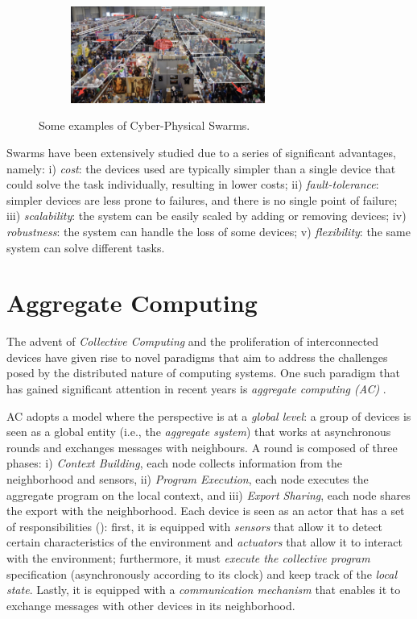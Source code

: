 \documentclass[12pt,a4paper,openright,twoside]{book}
\begin{document}
\begin{figure}[t]
\begin{subfigure}[b]{0.49\textwidth}
        \centering
        \includegraphics[width=0.7\textwidth]{figures/crowd.png}
    \end{subfigure}
    \caption{Some examples of Cyber-Physical Swarms.}%
    \label{fig:cpsw}
\end{figure}


Swarms have been extensively studied due to a series of significant advantages, namely:
    i) \emph{cost}: the devices used are typically simpler than a single device that could solve the task individually, resulting in lower costs;
    ii) \emph{fault-tolerance}: simpler devices are less prone to failures, and there is no single point of failure;
    iii) \emph{scalability}: the system can be easily scaled by adding or removing devices;
    iv) \emph{robustness}: the system can handle the loss of some devices;
    v) \emph{flexibility}: the same system can solve different tasks.


%
\section{Aggregate Computing}

The advent of \emph{Collective Computing} and the proliferation of interconnected devices have given rise to novel 
    paradigms that aim to address the challenges posed by the distributed nature of computing
    systems. One such paradigm that has gained significant attention in recent years is 
    \emph{aggregate computing (AC)} \cite{AC}.

AC adopts a model where the perspective is at a \emph{global level}: 
    a group of devices is seen as a global entity (i.e., the \emph{aggregate system}) that works at asynchronous 
    rounds and exchanges messages with neighbours. 
    A round is composed of three phases:
    i) \emph{Context Building}, each node collects information from the 
        neighborhood and sensors,
    ii) \emph{Program Execution}, each node executes the aggregate program on the local context, and
    iii) \emph{Export Sharing}, each node shares the export with the neighborhood.
    Each device is seen as an actor that has a set of responsibilities (): first, it is equipped with 
    \emph{sensors} that allow it to detect certain characteristics of the environment and \emph{actuators} that allow 
    it to interact with the environment; furthermore, it must \emph{execute the collective program} specification 
    (asynchronously according to its clock) and keep track of the \emph{local state}. Lastly, it is equipped with 
    a \emph{communication mechanism} that enables it to exchange messages with other devices in its neighborhood.
\end{document}

